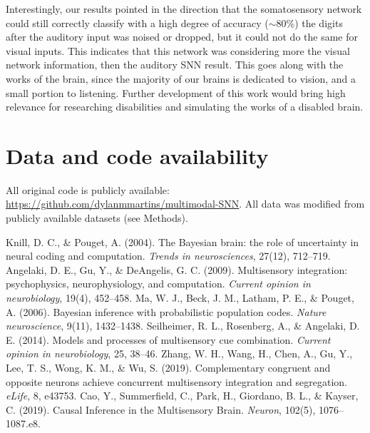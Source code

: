 \documentclass[conference]{IEEEtran}
\begin{document}
Interestingly, our results pointed in the direction that the somatosensory network could still correctly classify with a high degree of accuracy ($\sim$80\%) the digits after the auditory input was noised or dropped, but it could not do the same for visual inputs. This  indicates that this network was considering more the visual network information, then the auditory SNN result. This goes along with the works of the brain, since the majority of our brains is dedicated to vision, and a small portion to listening. Further development of this work would bring high relevance for researching disabilities and simulating the works of a disabled brain.

\section*{Data and code availability}
All original code is publicly available: \url{https://github.com/dylanmmartins/multimodal-SNN}. All data was modified from publicly available datasets (see Methods).

\begin{thebibliography}{00}
 Knill, D. C., \& Pouget, A. (2004). The Bayesian brain: the role of uncertainty in neural coding and computation. \textit{Trends in neurosciences}, 27(12), 712–719.
 Angelaki, D. E., Gu, Y., \& DeAngelis, G. C. (2009). Multisensory integration: psychophysics, neurophysiology, and computation. \textit{Current opinion in neurobiology}, 19(4), 452–458.
 Ma, W. J., Beck, J. M., Latham, P. E., \& Pouget, A. (2006). Bayesian inference with probabilistic population codes. \textit{Nature neuroscience}, 9(11), 1432–1438.
 Seilheimer, R. L., Rosenberg, A., \& Angelaki, D. E. (2014). Models and processes of multisensory cue combination. \textit{Current opinion in neurobiology}, 25, 38–46.
 Zhang, W. H., Wang, H., Chen, A., Gu, Y., Lee, T. S., Wong, K. M., \& Wu, S. (2019). Complementary congruent and opposite neurons achieve concurrent multisensory integration and segregation. \textit{eLife}, 8, e43753.
 Cao, Y., Summerfield, C., Park, H., Giordano, B. L., \& Kayser, C. (2019). Causal Inference in the Multisensory Brain. \textit{Neuron}, 102(5), 1076–1087.e8.
\end{thebibliography}
\end{document}
